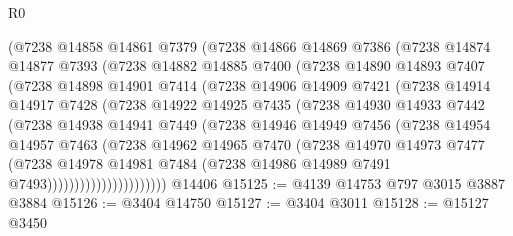\begin{lexlean}{R0}
\begin{coremodule}
              (@7238
                @14858
                @14861
                @7379
                (@7238
                  @14866
                  @14869
                  @7386
                  (@7238
                    @14874
                    @14877
                    @7393
                    (@7238
                      @14882
                      @14885
                      @7400
                      (@7238
                        @14890
                        @14893
                        @7407
                        (@7238
                          @14898
                          @14901
                          @7414
                          (@7238
                            @14906
                            @14909
                            @7421
                            (@7238
                              @14914
                              @14917
                              @7428
                              (@7238
                                @14922
                                @14925
                                @7435
                                (@7238
                                  @14930
                                  @14933
                                  @7442
                                  (@7238
                                    @14938
                                    @14941
                                    @7449
                                    (@7238
                                      @14946
                                      @14949
                                      @7456
                                      (@7238
                                        @14954
                                        @14957
                                        @7463
                                        (@7238
                                          @14962
                                          @14965
                                          @7470
                                          (@7238
                                            @14970
                                            @14973
                                            @7477
                                            (@7238
                                              @14978
                                              @14981
                                              @7484
                                              (@7238 @14986 @14989 @7491 @7493))))))))))))))))))))))
    @14406
@15125 := @4139 @14753 @797 @3015 @3887 @3884
@15126 := @3404 @14750
@15127 := @3404 @3011
@15128 := @15127 @3450

\end{coremodule}
\end{lexlean}
